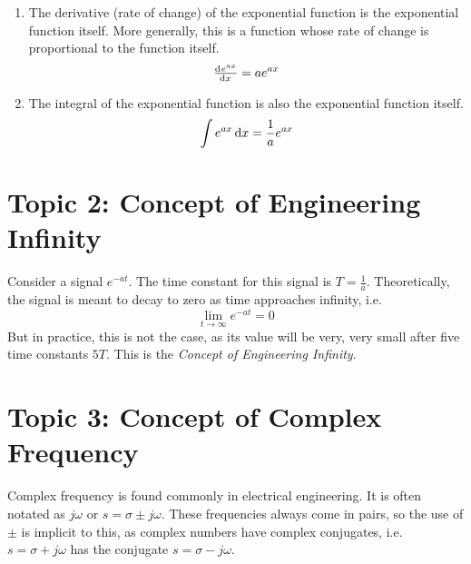 \documentclass[12pt]{report}
\begin{document}
\begin{enumerate}
    \item The derivative (rate of change) of the exponential function is the exponential function itself. More generally, this is a function whose rate of change is proportional to the function itself.
          \[
              \od{e^{ax}}{x} = ae^{ax}
          \]
    \item The integral of the exponential function is also the exponential function itself.
          \[
              \int e^{ax} \dif x = \frac{1}{a}e^{ax}
          \]
\end{enumerate}

\section{Topic 2: Concept of Engineering Infinity}
Consider a signal \(e^{-at}\). The time constant for this signal is \(T = \frac{1}{a}\). Theoretically, the signal is meant to decay to zero as time approaches infinity, i.e.
\[ 
    \lim_{t \to \infty} e^{-at} = 0 
\] 
But in practice, this is not the case, as its value will be very, very small after five time constants \(5T\). This is the \emph{Concept of Engineering Infinity}.

\section{Topic 3: Concept of Complex Frequency}
Complex frequency is found commonly in electrical engineering. It is often notated as \( j\omega \) or \( s = \sigma \pm j \omega \). These frequencies always come in pairs, so the use of \( \pm \) is implicit to this, as complex numbers have complex conjugates, i.e.
\(s = \sigma + j \omega \) has the conjugate \(s = \sigma - j\omega \).
\end{document}
